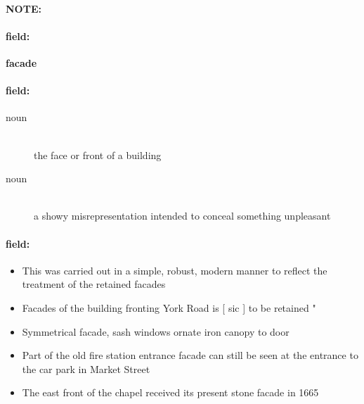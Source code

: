 \documentclass[12pt]{article}
\newenvironment{note}{\paragraph{NOTE:}}{}
\newenvironment{field}{\paragraph{field:}}{}
\begin{document}
\begin{note}
\begin{field}
\textbf{\large facade}
\end{field}


\begin{field}
\begin{description}
\item[noun] \hfill \\ 
the face or front of a building

\item[noun] \hfill \\ 
a showy misrepresentation intended to conceal something unpleasant

\end{description}
\end{field}

\begin{field}
\begin{itemize}
\item This was carried out in a simple, robust, modern manner to reflect the treatment of the retained facades
\item Facades of the building fronting York Road is [ sic ] to be retained " 
\item Symmetrical facade, sash windows ornate iron canopy to door
\item Part of the old fire station entrance facade can still be seen at the entrance to the car park in Market Street
\item The east front of the chapel received its present stone facade in 1665
\end{itemize}
\end{field}
\end{note}
\end{document}
